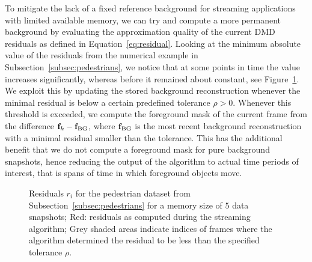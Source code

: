 To mitigate the lack of a fixed reference background for streaming applications with limited available memory, we can try and compute a more permanent background by evaluating the approximation quality of the current DMD residuals as defined in Equation~\ref{eq:residual}. Looking at the minimum absolute value of the residuals from the numerical example in Subsection~\ref{subsec:pedestrians}, we notice that at some points in time the value increases significantly, whereas before it remained about constant, see Figure~\ref{fig:pedestrian-residual}. We exploit this by updating the stored background reconstruction whenever the minimal residual is below a certain predefined tolerance $\rho > 0$. Whenever this threshold is exceeded, we compute the foreground mask of the current frame from the difference $\mathbf{f}_k - \mathbf{f}_\text{BG}$, where $\mathbf{f}_\text{BG}$ is the most recent background reconstruction with a minimal residual smaller than the tolerance. This has the additional benefit that we do not compute a foreground mask for pure background snapshots, hence reducing the output of the algorithm to actual time periods of interest, that is spans of time in which foreground objects move.

\begin{figure}[!ht]
    \centering
    \caption{Residuals $r_i$ for the pedestrian dataset from Subsection~\ref{subsec:pedestrians} for a memory size of $5$ data snapshots; Red: residuals as computed during the streaming algorithm; Grey shaded areas indicate indices of frames where the algorithm determined the residual to be less than the specified tolerance $\rho$.}\label{fig:pedestrian-residual}
\end{figure}


